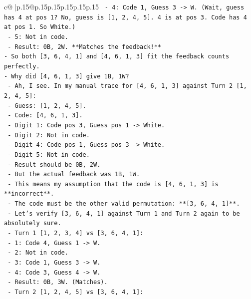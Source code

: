 \documentclass{article}
\begin{document}
{\begin{supertabular}{c@{$\;$}|p{.15\linewidth}@{}p{.15\linewidth}p{.15\linewidth}p{.15\linewidth}p{.15\linewidth}p{.15\linewidth}}
{{{\texttt{            {-} 4: Code 1, Guess 3 {-}> W. (Wait, guess has 4 at pos 1? No, guess is {[}1, 2, 4, 5{]}. 4 is at pos 3. Code has 4 at pos 1. So White.)} \\
\texttt{            {-} 5: Not in code.} \\
\texttt{            {-} Result: 0B, 2W. **Matches the feedback!**} \\
\texttt{{-} So both {[}3, 6, 4, 1{]} and {[}4, 6, 1, 3{]} fit the feedback counts perfectly.} \\
\texttt{{-} Why did {[}4, 6, 1, 3{]} give 1B, 1W?} \\
\texttt{    {-} Ah, I see. In my manual trace for {[}4, 6, 1, 3{]} against Turn 2 {[}1, 2, 4, 5{]}:} \\
\texttt{        {-} Guess: {[}1, 2, 4, 5{]}.} \\
\texttt{        {-} Code: {[}4, 6, 1, 3{]}.} \\
\texttt{        {-} Digit 1: Code pos 3, Guess pos 1 {-}> White.} \\
\texttt{        {-} Digit 2: Not in code.} \\
\texttt{        {-} Digit 4: Code pos 1, Guess pos 3 {-}> White.} \\
\texttt{        {-} Digit 5: Not in code.} \\
\texttt{        {-} Result should be 0B, 2W.} \\
\texttt{    {-} But the actual feedback was 1B, 1W.} \\
\texttt{    {-} This means my assumption that the code is {[}4, 6, 1, 3{]} is **incorrect**.} \\
\texttt{    {-} The code must be the other valid permutation: **{[}3, 6, 4, 1{]}**.} \\
\texttt{    {-} Let's verify {[}3, 6, 4, 1{]} against Turn 1 and Turn 2 again to be absolutely sure.} \\
\texttt{        {-} Turn 1 {[}1, 2, 3, 4{]} vs {[}3, 6, 4, 1{]}:} \\
\texttt{            {-} 1: Code 4, Guess 1 {-}> W.} \\
\texttt{            {-} 2: Not in code.} \\
\texttt{            {-} 3: Code 1, Guess 3 {-}> W.} \\
\texttt{            {-} 4: Code 3, Guess 4 {-}> W.} \\
\texttt{            {-} Result: 0B, 3W. (Matches).} \\
\texttt{        {-} Turn 2 {[}1, 2, 4, 5{]} vs {[}3, 6, 4, 1{]}:} \\
}}}
\end{supertabular}}
\end{document}

